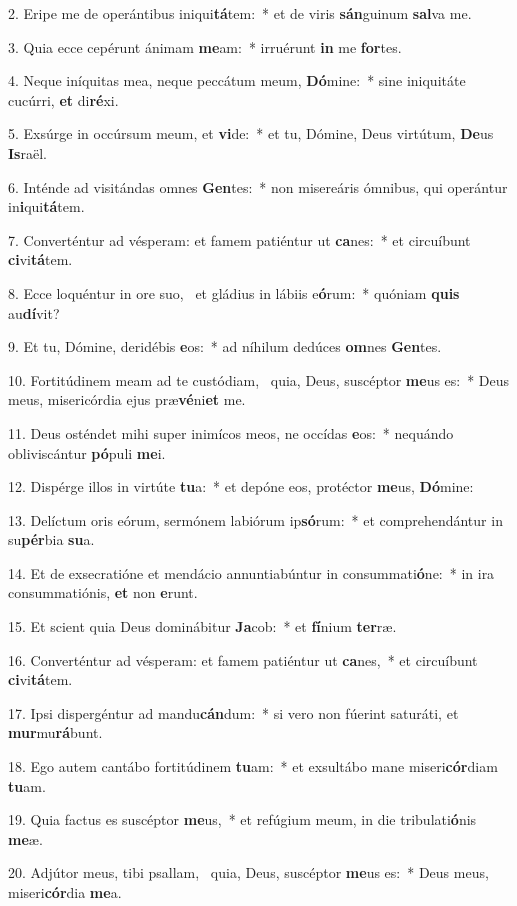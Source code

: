 2. Eripe me de operántibus iniqui\textbf{tá}tem:~*  et de viris \textbf{sán}guinum \textbf{sal}va me.\

3. Quia ecce cepérunt ánimam \textbf{me}am:~*  irruérunt \textbf{in} me \textbf{for}tes.\

4. Neque iníquitas mea, neque peccátum meum, \textbf{Dó}mine:~*  sine iniquitáte cucúrri, \textbf{et} di\textbf{ré}xi.\

5. Exsúrge in occúrsum meum, et \textbf{vi}de:~*  et tu, Dómine, Deus virtútum, \textbf{De}us \textbf{Is}raël.\

6. Inténde ad visitándas omnes \textbf{Gen}tes:~*  non misereáris ómnibus, qui operántur in\textbf{i}qui\textbf{tá}tem.\

7. Converténtur ad vésperam: et famem patiéntur ut \textbf{ca}nes:~*  et circuíbunt \textbf{ci}vi\textbf{tá}tem.\

8. Ecce loquéntur in ore suo, \dag\  et gládius in lábiis e\textbf{ó}rum:~*  quóniam \textbf{quis} au\textbf{dí}vit?\

9. Et tu, Dómine, deridébis \textbf{e}os:~*  ad níhilum dedúces \textbf{om}nes \textbf{Gen}tes.\

10. Fortitúdinem meam ad te custódiam, \dag\  quia, Deus, suscéptor \textbf{me}us es:~*  Deus meus, misericórdia ejus præ\textbf{vé}ni\textbf{et} me.\

11. Deus osténdet mihi super inimícos meos, ne occídas \textbf{e}os:~*  nequándo obliviscántur \textbf{pó}puli \textbf{me}i.\

12. Dispérge illos in virtúte \textbf{tu}a:~*  et depóne eos, protéctor \textbf{me}us, \textbf{Dó}mine:\

13. Delíctum oris eórum, sermónem labiórum ip\textbf{só}rum:~*  et comprehendántur in su\textbf{pér}bia \textbf{su}a.\

14. Et de exsecratióne et mendácio annuntiabúntur in consummati\textbf{ó}ne:~*  in ira consummatiónis, \textbf{et} non \textbf{e}runt.\

15. Et scient quia Deus dominábitur \textbf{Ja}cob:~*  et \textbf{fí}nium \textbf{ter}ræ.\

16. Converténtur ad vésperam: et famem patiéntur ut \textbf{ca}nes,~*  et circuíbunt \textbf{ci}vi\textbf{tá}tem.\

17. Ipsi dispergéntur ad mandu\textbf{cán}dum:~*  si vero non fúerint saturáti, et \textbf{mur}mu\textbf{rá}bunt.\

18. Ego autem cantábo fortitúdinem \textbf{tu}am:~*  et exsultábo mane miseri\textbf{cór}diam \textbf{tu}am.\

19. Quia factus es suscéptor \textbf{me}us,~*  et refúgium meum, in die tribulati\textbf{ó}nis \textbf{me}æ.\

20. Adjútor meus, tibi psallam, \dag\  quia, Deus, suscéptor \textbf{me}us es:~*  Deus meus, miseri\textbf{cór}dia \textbf{me}a.\


